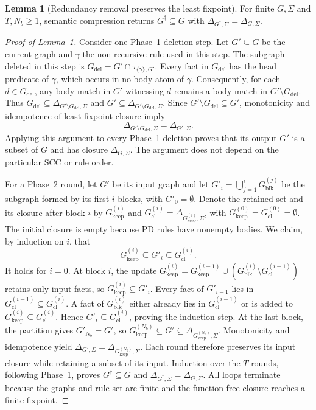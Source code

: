 \documentclass[conference]{IEEEtran}
\theoremstyle{definition}
\newtheorem{lemma}{Lemma}
\newcommand{\Gc}{G^{\dagger}}
\newcommand{\Gdel}{G_{\mathrm{del}}}
\newcommand{\Gblock}{G_{\mathrm{blk}}}
\newcommand{\Gkeep}{G_{\mathrm{keep}}}
\newcommand{\Gcl}{G_{\mathrm{cl}}}
\newcommand{\Sig}{\Sigma}
\begin{document}
\begin{lemma}[Redundancy removal preserves the least fixpoint]
\label{lem:closurepreservation}
For finite $G,\Sig$ and $T,N_b\geq1$, semantic compression returns
$\Gc\subseteq G$ with $\Delta_{\Gc,\Sig}=\Delta_{G,\Sig}$.
\end{lemma}

\begin{proof}[Proof of Lemma~\ref{lem:closurepreservation}]
Consider one Phase~1 deletion step. Let $G'\subseteq G$ be the current
graph and $\gamma$ the non-recursive rule used in this step.
The subgraph deleted in this step is $\Gdel=G'\cap\tau_{\{\gamma\},G'}$. Every fact in $\Gdel$
has the head predicate of $\gamma$, which occurs in no body atom of
$\gamma$. Consequently, for each $d\in \Gdel$, any body match in $G'$
witnessing $d$ remains a body match in $G'\setminus \Gdel$. Thus
$\Gdel\subseteq\Delta_{G'\setminus \Gdel,\Sig}$ and
$G'\subseteq\Delta_{G'\setminus \Gdel,\Sig}$. Since $G'\setminus \Gdel\subseteq G'$,
monotonicity and idempotence of least-fixpoint closure imply
\[
\Delta_{G'\setminus \Gdel,\Sig}=\Delta_{G',\Sig}.
\]
Applying this argument to every Phase~1 deletion proves that its
output $G'$ is a subset of $G$ and has closure $\Delta_{G,\Sig}$.
The argument does not depend on the particular SCC or rule order.

For a Phase~2 round, let $G'$ be its input graph and let
$G'_i=\bigcup_{j=1}^{i}\Gblock^{(j)}$ be the subgraph formed by its first $i$ blocks,
with $G'_0=\emptyset$.
Denote the retained set and its closure after block $i$ by $\Gkeep^{(i)}$
and $\Gcl^{(i)}=\Delta_{\Gkeep^{(i)},\Sig}$, with $\Gkeep^{(0)}=\Gcl^{(0)}=\emptyset$.
The initial closure is empty because PD rules have nonempty bodies.
We claim, by induction on $i$, that
\[
\Gkeep^{(i)}\subseteq G'_i\subseteq \Gcl^{(i)}.
\]
It holds for $i=0$. At block $i$, the update
$\Gkeep^{(i)}=\Gkeep^{(i-1)}\cup(\Gblock^{(i)}\setminus \Gcl^{(i-1)})$ retains only input facts,
so $\Gkeep^{(i)}\subseteq G'_i$. Every fact of $G'_{i-1}$ lies in
$\Gcl^{(i-1)}\subseteq \Gcl^{(i)}$. A fact of $\Gblock^{(i)}$ either already lies in
$\Gcl^{(i-1)}$ or is added to $\Gkeep^{(i)}\subseteq \Gcl^{(i)}$. Hence
$G'_i\subseteq \Gcl^{(i)}$, proving the induction step.
At the last block, the partition gives $G'_{N_b}=G'$, so
$\Gkeep^{(N_b)}\subseteq G'\subseteq\Delta_{\Gkeep^{(N_b)},\Sig}$.
Monotonicity and idempotence yield
$\Delta_{G',\Sig}=\Delta_{\Gkeep^{(N_b)},\Sig}$. Each round therefore preserves its
input closure while retaining a subset of its input. Induction over
the $T$ rounds, following Phase~1, proves
$\Gc\subseteq G$ and $\Delta_{\Gc,\Sig}=\Delta_{G,\Sig}$.
All loops terminate because the graphs and rule set are finite and
the function-free closure reaches a finite fixpoint.
\end{proof}
\end{document}
